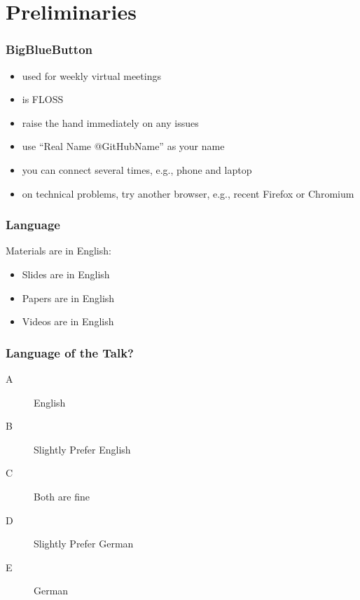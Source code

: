 

\title{\mylecture}
\date{Hello}



\section{Preliminaries}

\begin{frame}
	\frametitle{BigBlueButton}
	\begin{itemize}
		\item used for weekly virtual meetings
		\item is FLOSS
		\item raise the hand immediately on any issues
		\item use ``Real Name @GitHubName'' as your name
		\item you can connect several times, e.g., phone and laptop
		\item on technical problems, try another browser, e.g., recent Firefox or Chromium
	\end{itemize}
\end{frame}

\begin{frame}
	\frametitle{Language}
	Materials are in English:
	\begin{itemize}
		\item Slides are in English
		\item Papers are in English
		\item Videos are in English
	\end{itemize}
\end{frame}

\begin{assignment}
	\frametitle{Language of the Talk?}
	\begin{task}
	\begin{description}
	\item[A] English
	\item[B] Slightly Prefer English
	\item[C] Both are fine
	\item[D] Slightly Prefer German
	\item[E] German
	\end{description}
	\end{task}
\end{assignment}

